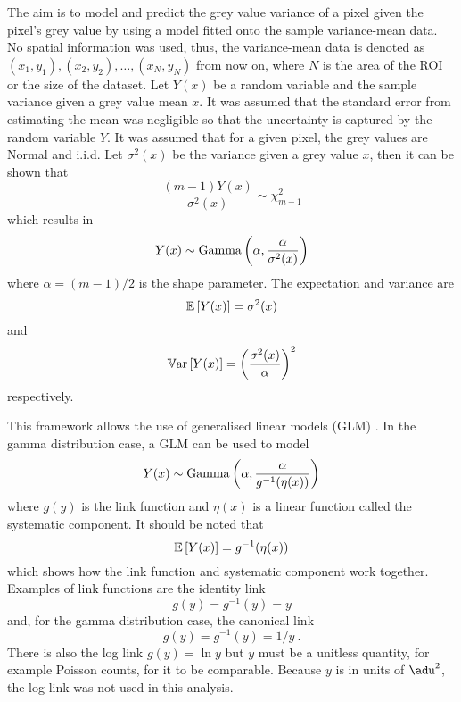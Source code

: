 The aim is to model and predict the grey value variance of a pixel given the pixel's grey value by using a model fitted onto the sample variance-mean data. No spatial information was used, thus, the variance-mean data is denoted as $(x_1,y_1),(x_2,y_2),\dotsc,(x_N,y_N)$ from now on, where $N$ is the area of the ROI or the size of the dataset. Let $Y(x)$ be a random variable and the sample variance given a grey value mean $x$. It was assumed that the standard error from estimating the mean was negligible so that the uncertainty is captured by the random variable $Y$. It was assumed that for a given pixel, the grey values are Normal and i.i.d. Let $\sigma^2(x)$ be the variance given a grey value $x$, then it can be shown that
\begin{equation}
\dfrac{(m-1)Y(x)}{\sigma^2(x)}\sim\chi^2_{m-1}
\end{equation}
which results in
\begin{equation}
Y(x)\sim\operatorname{Gamma}\left(\alpha,\dfrac{\alpha}{\sigma^2(x)}\right)
\end{equation}
where $\alpha=(m-1)/2$ is the shape parameter. The expectation and variance are
\begin{equation}
\operatorname{\mathbb{E}}\left[Y(x)\right]=\sigma^2(x)
\end{equation}
and
\begin{equation}
\operatorname{\mathbb{V}ar}\left[Y(x)\right]=\left(\dfrac{\sigma^2(x)}{\alpha}\right)^2
\end{equation}
respectively.

This framework allows the use of generalised linear models (GLM) \citep{nelder1972generalized,nelder1972generalized_2, mccullagh1984generalized}. In the gamma distribution case, a GLM can be used to model
\begin{equation}
Y(x)\sim\operatorname{Gamma}\left(\alpha,\dfrac{\alpha}{g^{-1}(\eta(x))}\right)
\end{equation}
where $g(y)$ is the link function and $\eta(x)$ is a linear function called the systematic component. It should be noted that
\begin{equation}
  \operatorname{\mathbb{E}}\left[Y(x)\right]=g^{-1}(\eta(x))
\end{equation}
which shows how the link function and systematic component work together. Examples of link functions are the identity link
\begin{equation}
g(y)=g^{-1}(y)=y
\end{equation}
and, for the gamma distribution case, the canonical link
\begin{equation}
g(y)=g^{-1}(y)=1/y \ .
\end{equation}
There is also the log link $g(y)=\ln y$ but $y$ must be a unitless quantity, for example Poisson counts, for it to be comparable. Because $y$ is in units of $\SI{}{\adu^2}$, the log link was not used in this analysis.

